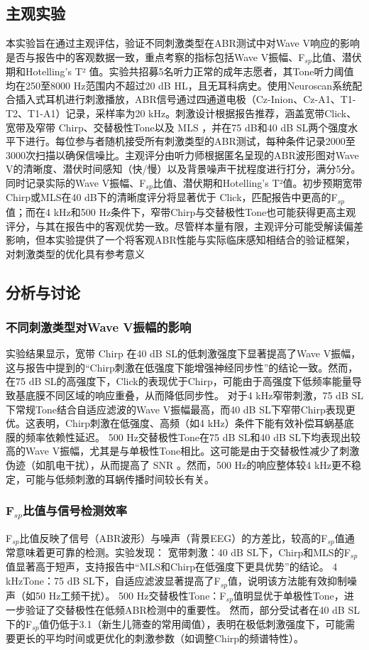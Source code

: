 \subsection*{主观实验}
本实验旨在通过主观评估，验证不同刺激类型在ABR测试中对Wave V响应的影响是否与报告中的客观数据一致，重点考察的指标包括Wave V振幅、F$_{sp}$比值、潜伏期和Hotelling's T² 值。实验共招募5名听力正常的成年志愿者，其Tone听力阈值均在250至8000 Hz范围内不超过20 dB HL，且无耳科病史。使用Neuroscan系统配合插入式耳机进行刺激播放，ABR信号通过四通道电极（Cz-Inion、Cz-A1、T1-T2、T1-A1）记录，采样率为20 kHz。刺激设计根据报告推荐，涵盖宽带Click、宽带及窄带 Chirp、交替极性Tone以及 MLS ，并在75 dB和40 dB SL两个强度水平下进行。每位参与者随机接受所有刺激类型的ABR测试，每种条件记录2000至3000次扫描以确保信噪比。主观评分由听力师根据匿名呈现的ABR波形图对Wave V的清晰度、潜伏时间感知（快/慢）以及背景噪声干扰程度进行打分，满分5分。同时记录实际的Wave V振幅、F$_{sp}$比值、潜伏期和Hotelling's T²值。初步预期宽带Chirp或MLS在40 dB下的清晰度评分将显著优于 Click，匹配报告中更高的F$_{sp}$值；而在4 kHz和500 Hz条件下，窄带Chirp与交替极性Tone也可能获得更高主观评分，与其在报告中的客观优势一致。尽管样本量有限，主观评分可能受解读偏差影响，但本实验提供了一个将客观ABR性能与实际临床感知相结合的验证框架，对刺激类型的优化具有参考意义

\subsection*{分析与讨论}
\subsubsection{不同刺激类型对Wave V振幅的影响}
实验结果显示，宽带 Chirp 在40 dB SL的低刺激强度下显著提高了Wave V振幅，这与报告中提到的“Chirp刺激在低强度下能增强神经同步性”的结论一致。然而，在75 dB SL的高强度下，Click的表现优于Chirp，可能由于高强度下低频率能量导致基底膜不同区域的响应重叠，从而降低同步性。
对于4 kHz窄带刺激，75 dB SL下常规Tone结合自适应滤波的Wave V振幅最高，而40 dB SL下窄带Chirp表现更优。这表明，Chirp刺激在低强度、高频（如4 kHz）条件下能有效补偿耳蜗基底膜的频率依赖性延迟。
500 Hz交替极性Tone在75 dB SL和40 dB SL下均表现出较高的Wave V振幅，尤其是与单极性Tone相比。这可能是由于交替极性减少了刺激伪迹（如肌电干扰），从而提高了 SNR 。然而，500 Hz的响应整体较4 kHz更不稳定，可能与低频刺激的耳蜗传播时间较长有关。

\subsubsection{F$_{sp}$比值与信号检测效率}
F$_{sp}$比值反映了信号（ABR波形）与噪声（背景EEG）的方差比，较高的F$_{sp}$值通常意味着更可靠的检测。实验发现：
宽带刺激：40 dB SL下，Chirp和MLS的F$_{sp}$值显著高于短声，支持报告中“MLS和Chirp在低强度下更具优势”的结论。
4 kHzTone：75 dB SL下，自适应滤波显著提高了F$_{sp}$值，说明该方法能有效抑制噪声（如50 Hz工频干扰）。
500 Hz交替极性Tone：F$_{sp}$值明显优于单极性Tone，进一步验证了交替极性在低频ABR检测中的重要性。
然而，部分受试者在40 dB SL下的F$_{sp}$值仍低于3.1（新生儿筛查的常用阈值），表明在极低刺激强度下，可能需要更长的平均时间或更优化的刺激参数（如调整Chirp的频谱特性）。

